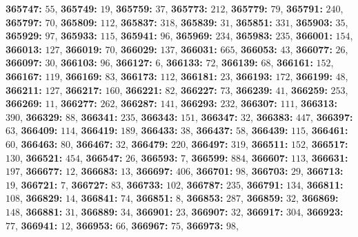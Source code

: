 \textsf{\bfseries 365747:} $55$, \textsf{\bfseries 365749:} $19$, \textsf{\bfseries 365759:} $37$, \textsf{\bfseries 365773:} $212$, \textsf{\bfseries 365779:} $79$, \textsf{\bfseries 365791:} $240$, \textsf{\bfseries 365797:} $70$, \textsf{\bfseries 365809:} $112$, \textsf{\bfseries 365837:} $318$, \textsf{\bfseries 365839:} $31$, \textsf{\bfseries 365851:} $331$, \textsf{\bfseries 365903:} $35$, \textsf{\bfseries 365929:} $97$, \textsf{\bfseries 365933:} $115$, \textsf{\bfseries 365941:} $96$, \textsf{\bfseries 365969:} $234$, \textsf{\bfseries 365983:} $235$, \textsf{\bfseries 366001:} $154$, \textsf{\bfseries 366013:} $127$, \textsf{\bfseries 366019:} $70$, \textsf{\bfseries 366029:} $137$, \textsf{\bfseries 366031:} $665$, \textsf{\bfseries 366053:} $43$, \textsf{\bfseries 366077:} $26$, \textsf{\bfseries 366097:} $30$, \textsf{\bfseries 366103:} $96$, \textsf{\bfseries 366127:} $6$, \textsf{\bfseries 366133:} $72$, \textsf{\bfseries 366139:} $68$, \textsf{\bfseries 366161:} $152$, \textsf{\bfseries 366167:} $119$, \textsf{\bfseries 366169:} $83$, \textsf{\bfseries 366173:} $112$, \textsf{\bfseries 366181:} $23$, \textsf{\bfseries 366193:} $172$, \textsf{\bfseries 366199:} $48$, \textsf{\bfseries 366211:} $127$, \textsf{\bfseries 366217:} $160$, \textsf{\bfseries 366221:} $82$, \textsf{\bfseries 366227:} $73$, \textsf{\bfseries 366239:} $41$, \textsf{\bfseries 366259:} $253$, \textsf{\bfseries 366269:} $11$, \textsf{\bfseries 366277:} $262$, \textsf{\bfseries 366287:} $141$, \textsf{\bfseries 366293:} $232$, \textsf{\bfseries 366307:} $111$, \textsf{\bfseries 366313:} $390$, \textsf{\bfseries 366329:} $88$, \textsf{\bfseries 366341:} $235$, \textsf{\bfseries 366343:} $151$, \textsf{\bfseries 366347:} $32$, \textsf{\bfseries 366383:} $447$, \textsf{\bfseries 366397:} $63$, \textsf{\bfseries 366409:} $114$, \textsf{\bfseries 366419:} $189$, \textsf{\bfseries 366433:} $38$, \textsf{\bfseries 366437:} $58$, \textsf{\bfseries 366439:} $115$, \textsf{\bfseries 366461:} $60$, \textsf{\bfseries 366463:} $80$, \textsf{\bfseries 366467:} $32$, \textsf{\bfseries 366479:} $220$, \textsf{\bfseries 366497:} $319$, \textsf{\bfseries 366511:} $152$, \textsf{\bfseries 366517:} $130$, \textsf{\bfseries 366521:} $454$, \textsf{\bfseries 366547:} $26$, \textsf{\bfseries 366593:} $7$, \textsf{\bfseries 366599:} $884$, \textsf{\bfseries 366607:} $113$, \textsf{\bfseries 366631:} $197$, \textsf{\bfseries 366677:} $12$, \textsf{\bfseries 366683:} $13$, \textsf{\bfseries 366697:} $406$, \textsf{\bfseries 366701:} $98$, \textsf{\bfseries 366703:} $29$, \textsf{\bfseries 366713:} $19$, \textsf{\bfseries 366721:} $7$, \textsf{\bfseries 366727:} $83$, \textsf{\bfseries 366733:} $102$, \textsf{\bfseries 366787:} $235$, \textsf{\bfseries 366791:} $134$, \textsf{\bfseries 366811:} $108$, \textsf{\bfseries 366829:} $14$, \textsf{\bfseries 366841:} $74$, \textsf{\bfseries 366851:} $8$, \textsf{\bfseries 366853:} $287$, \textsf{\bfseries 366859:} $32$, \textsf{\bfseries 366869:} $148$, \textsf{\bfseries 366881:} $31$, \textsf{\bfseries 366889:} $34$, \textsf{\bfseries 366901:} $23$, \textsf{\bfseries 366907:} $32$, \textsf{\bfseries 366917:} $304$, \textsf{\bfseries 366923:} $77$, \textsf{\bfseries 366941:} $12$, \textsf{\bfseries 366953:} $66$, \textsf{\bfseries 366967:} $75$, \textsf{\bfseries 366973:} $98$, 
